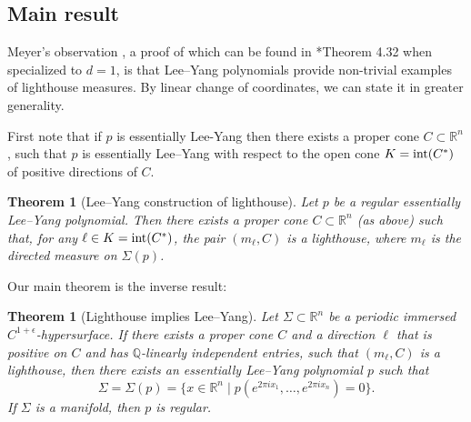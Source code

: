 \documentclass[11pt,letterpaper]{amsart}
\theoremstyle{definition}
\theoremstyle{plain}
\newtheorem{thm}[Def]{Theorem}
\newcommand{\R}{{\mathbb R}}
\newcommand{\Q}{{\mathbb Q}}
\begin{document}
\subsection{Main result}
Meyer's observation \cite{Meyer2023}, a proof of which can be found in \cite{alon2025higher}*{Theorem 4.32} when specialized to $d=1$, is that Lee--Yang polynomials provide non-trivial examples of lighthouse measures. By linear change of coordinates, we can state it in greater generality.


First note that if $p$ is essentially Lee-Yang then there exists a proper cone $C\subset\R^n$, such that $p$ is essentially Lee--Yang with respect to the open cone $K=\textnormal{int}(C^*)$ of positive directions of $C$. 
\begin{thm}[Lee--Yang construction of lighthouse]\label{thm: moreover} Let $p$ be a regular essentially Lee--Yang polynomial. Then there exists a proper cone $C\subset\R^n$ (as above) such that, for any  $\ell\in K=\textnormal{int}(C^*)$, the pair $(m_{\ell},C)$ is a lighthouse, where $m_{\ell}$ is the directed measure on $\Sigma(p)$.
\end{thm}

Our main theorem is the inverse result:
\begin{thm}[Lighthouse implies Lee--Yang]\label{thm: main}
    Let $\Sigma\subset\R^n$ be a periodic immersed $C^{1+\epsilon}$-hypersurface. If there exists a proper cone $C$ and a direction $\ell$ that is positive on $C$ and has $\Q$-linearly independent entries, such that $(m_{\ell},C)$ is a lighthouse, then there exists an essentially Lee--Yang polynomial $p$ such that 
\[\Sigma=\Sigma(p)=\{x\in\R^n\mid p(e^{2\pi i x_{1}},\ldots,e^{2\pi i x_{n}})=0 \}.\]
If $\Sigma$ is a manifold, then $p$ is regular.
\end{thm}
\end{document}
